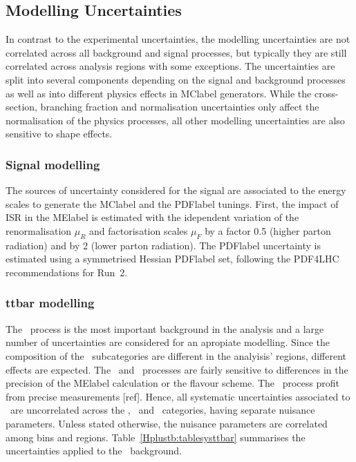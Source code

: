 \subsection{Modelling Uncertainties}
In contrast to the experimental uncertainties, the modelling uncertainties are not correlated across all background and signal processes, but typically they are still correlated across analysis regions with some exceptions. The uncertainties are split into several components depending on the signal and background processes as well as into different physics effects in \acrshort{MClabel} generators. While the cross-section, branching fraction and normalisation uncertainties only affect the normalisation of the physics processes, all other modelling uncertainties are also sensitive to shape effects.


\subsubsection{Signal modelling}

The sources of uncertainty considered for the signal are associated to the energy scales to generate the \acrshort{MClabel} and the \acrshort{PDFlabel} tunings. First, the impact of ISR in the \acrshort{MElabel} is estimated with the idependent variation of the renormalisation $\mu_R$ and factorisation scales $\mu_F$ by a factor 0.5 (higher parton radiation) and by 2 (lower parton radiation). The \acrshort{PDFlabel} uncertainty is estimated using a symmetrised Hessian \acrshort{PDFlabel} set, following the PDF4LHC recommendations for Run~2. %
\subsubsection{ttbar modelling}

The \ttbar\ process is the most important background in the analysis and a large number of uncertainties are considered for an apropiate modelling. Since the composition of the \ttbar\ subcategories are different in the analyisis' regions, different effects are expected. The \ttb\ and \ttc\ processes are fairly sensitive to differences in the precision of the \acrshort{MElabel} calculation or the flavour scheme. The \ttl\ process profit from precise measurements [ref]. Hence, all systematic uncertainties associated to \ttbar\ are uncorrelated across the \ttb, \ttc\ and \ttl\ categories, having separate nuisance parameters. Unless stated otherwise, the nuisance parameters are correlated among bins and regions. Table~\ref{Hplustb:tablesysttbar} summarises the uncertainties applied to the \ttbar\ background. 

